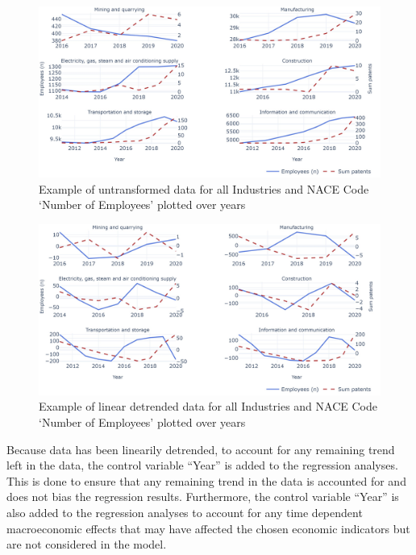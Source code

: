 \documentclass[
  11,
  a4paperpaper,
]{article}
\begin{document}
\begin{figure}[H]

{\centering \includegraphics{rieg2023_files/figure-pdf/fig-untransformed-data-example-output-1.jpeg}

}

\caption{\label{fig-untransformed-data-example}Example of untransformed
data for all Industries and NACE Code `Number of Employees' plotted over
years}

\end{figure}

\begin{figure}[H]

{\centering \includegraphics{rieg2023_files/figure-pdf/fig-transformed-data-example-output-1.jpeg}

}

\caption{\label{fig-transformed-data-example}Example of linear detrended
data for all Industries and NACE Code `Number of Employees' plotted over
years}

\end{figure}

Because data has been linearily detrended, to account for any remaining
trend left in the data, the control variable ``Year'' is added to the
regression analyses. This is done to ensure that any remaining trend in
the data is accounted for and does not bias the regression results.
Furthermore, the control variable ``Year'' is also added to the
regression analyses to account for any time dependent macroeconomic
effects that may have affected the chosen economic indicators but are
not considered in the model.
\end{document}
